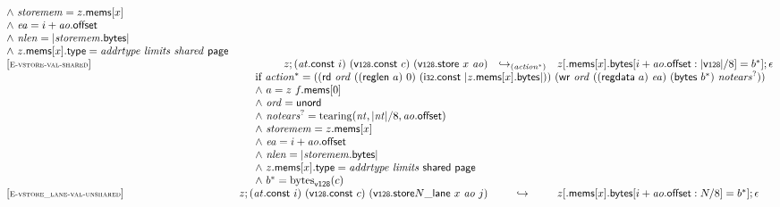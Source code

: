 $$\begin{array}[t]{@{}lrcl@{}l@{}}
{\begin{array}[t]{@{}l@{}}
{\land}~ {\mathit{storemem}} = z{.}\mathsf{mems}{}[x] \\
{\land}~ {\mathit{ea}} = i + {\mathit{ao}}{.}\mathsf{offset} \\
{\land}~ {\mathit{nlen}} = {|{\mathit{storemem}}{.}\mathsf{bytes}|} \\
{\land}~ z{.}\mathsf{mems}{}[x]{.}\mathsf{type} = {\mathit{addrtype}}~{\mathit{limits}}~{\mathit{shared}}~\mathsf{page} \\
\end{array}
} \\
{[\textsc{\scriptsize E{-}vstore{-}val{-}shared}]} \quad & z ; ({\mathit{at}}{.}\mathsf{const}~i)~(\mathsf{v{\scriptstyle 128}}{.}\mathsf{const}~c)~(\mathsf{v{\scriptstyle 128}}{.}\mathsf{store}~x~{\mathit{ao}}) & {\hookrightarrow}_{({{\mathit{action}}^\ast})} {} & z{}[{.}\mathsf{mems}{}[x]{.}\mathsf{bytes}{}[i + {\mathit{ao}}{.}\mathsf{offset} : {|\mathsf{v{\scriptstyle 128}}|} / 8] = {b^\ast}] ; \epsilon &  \\
& \multicolumn{4}{@{}l@{}}{\quad
\quad
\begin{array}[t]{@{}l@{}}
\mbox{if}~ {{\mathit{action}}^\ast} = ((\mathsf{rd}~{\mathit{ord}}~((\mathsf{reglen}~a)~0)~(\mathsf{i{\scriptstyle 32}}{.}\mathsf{const}~{|z{.}\mathsf{mems}{}[x]{.}\mathsf{bytes}|}))~(\mathsf{wr}~{\mathit{ord}}~((\mathsf{regdata}~a)~{\mathit{ea}})~(\mathsf{bytes}~{b^\ast})~{{\mathit{notears}}^?})) \\
{\land}~ a = z~f{.}\mathsf{mems}{}[0] \\
{\land}~ {\mathit{ord}} = \mathsf{unord} \\
{\land}~ {{\mathit{notears}}^?} = {\mathrm{tearing}}({\mathit{nt}}, {|{\mathit{nt}}|} / 8, {\mathit{ao}}{.}\mathsf{offset}) \\
{\land}~ {\mathit{storemem}} = z{.}\mathsf{mems}{}[x] \\
{\land}~ {\mathit{ea}} = i + {\mathit{ao}}{.}\mathsf{offset} \\
{\land}~ {\mathit{nlen}} = {|{\mathit{storemem}}{.}\mathsf{bytes}|} \\
{\land}~ z{.}\mathsf{mems}{}[x]{.}\mathsf{type} = {\mathit{addrtype}}~{\mathit{limits}}~\mathsf{shared}~\mathsf{page} \\
{\land}~ {b^\ast} = {{\mathrm{bytes}}}_{\mathsf{v{\scriptstyle 128}}}(c) \\
\end{array}
} \\
{[\textsc{\scriptsize E{-}vstore\_lane{-}val{-}unshared}]} \quad & z ; ({\mathit{at}}{.}\mathsf{const}~i)~(\mathsf{v{\scriptstyle 128}}{.}\mathsf{const}~c)~({\mathsf{v{\scriptstyle 128}}{.}\mathsf{store}}{N}{\mathsf{\_}}{\mathsf{lane}}~x~{\mathit{ao}}~j) & \hookrightarrow & z{}[{.}\mathsf{mems}{}[x]{.}\mathsf{bytes}{}[i + {\mathit{ao}}{.}\mathsf{offset} : N / 8] = {b^\ast}] ; \epsilon &  \\

\end{array}$$
